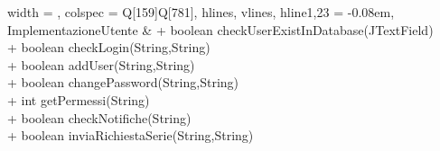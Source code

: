 \begin{longtblr}[
    label = none,
    entry = none,
  ]{
    width = \linewidth,
    colspec = {Q[159]Q[781]},
    hlines,
    vlines,
    hline{1,23} = {-}{0.08em},
  }
  ImplementazioneUtente  & {+ boolean checkUserExistInDatabase(JTextField)\\+ boolean checkLogin(String,String)\\+ boolean addUser(String,String)\\+ boolean changePassword(String,String)\\+ int getPermessi(String)\\+ boolean checkNotifiche(String)\\+ boolean inviaRichiestaSerie(String,String)}                                                                                                                                                                                                                                                                                                                                                                                                                                                                                                                                                                                                                                                                                                                                                                                                                                                                                                                                                                                                                                                                                                                                                                                                                                                                                                                                                                                                                                                                                                                                                                                                                     \\

\end{longtblr}
